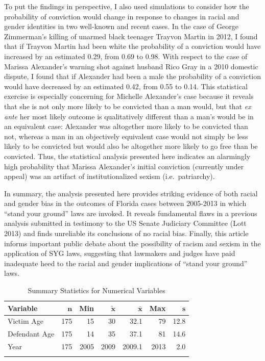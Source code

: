 \documentclass[12pt,article]{article}
\begin{document}
To put the findings in perspective, I also used simulations to consider
how the probability of conviction would change in response to changes in
racial and gender identities in two well-known and recent cases. In the
case of George Zimmerman's killing of unarmed black teenager Trayvon
Martin in 2012, I found that if Trayvon Martin had been white the
probability of a conviction would have increased by an estimated 0.29,
from 0.69 to 0.98. With respect to the case of Marissa Alexander's
warning shot against husband Rico Gray in a 2010 domestic dispute, I
found that if Alexander had been a male the probability of a conviction
would have decreased by an estimated 0.42, from 0.55 to 0.14. This
statistical exercise is especially concerning for Michelle Alexander's
case because it reveals that she is not only more likely to be convicted
than a man would, but that \emph{ex ante} her most likely outcome is
qualitatively different than a man's would be in an equivalent case:
Alexander was altogether more likely to be convicted than not, whereas a
man in an objectively equivalent case would not simply be less likely to
be convicted but would also be altogether more likely to go free than be
convicted. Thus, the statistical analysis presented here indicates an
alarmingly high probability that Marissa Alexander's initial conviction
(currently under appeal) was an artifact of institutionalized sexism
(i.e.~patriarchy).

In summary, the analysis presented here provides striking evidence of
both racial and gender bias in the outcomes of Florida cases between
2005-2013 in which ``stand your ground'' laws are invoked. It reveals
fundamental flaws in a previous analysis submitted in testimony to the
US Senate Judiciary Committee (Lott 2013) and finds unreliable its
conclusions of no racial bias. Finally, this article informs
important public debate about the possibility of racism and sexism in
the application of SYG laws, suggesting that lawmakers and judges have
paid inadequate heed to the racial and gender implications of ``stand
your ground'' laws.

\pagebreak

\singlespacing

{\footnotesize
\begin{longtable}{lrrrrrr}
\caption{Summary Statistics for Numerical Variables} \\
 \textbf{Variable} & $\mathbf{n}$ & \textbf{Min} & $\mathbf{\widetilde{x}}$ & $\mathbf{\bar{x}}$ & \textbf{Max} & $\mathbf{s}$ \\ 
  \hline
Victim Age & 175 &   15 &   30 &   32.1 &   79 & 12.8 \\ 
  Defendant Age & 175 &   14 &   35 &   37.1 &   81 & 14.6 \\ 
  Year & 175 & 2005 & 2009 & 2009.1 & 2013 &  2.0 \\ 
  \hline
\label{Summary Statistics for Numerical Variables}
\end{longtable}
}
\end{document}
